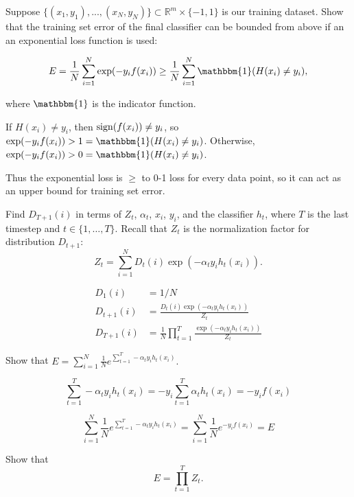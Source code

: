 Suppose $\{(x_1, y_1), ..., (x_N, y_N)\} \subset \mathbb{R}^m \times \{-1,1\}$ is our training dataset.  Show that the training set error of the final classifier can be bounded from
above if an an exponential loss function is used:

$$E = \frac{1}{N} \sum\limits_{i=1}^N \exp(-y_{i}f(x_i)) \geq \frac{1}{N} \sum\limits_{i=1}^N \mathbbm{1}(H(x_i) \neq y_i),$$

where $\mathbbm{1}$ is the indicator function.

\begin{solution}
    If $H(x_i) \neq y_i$, then $\operatorname{sign}(f(x_i)) \neq y_i$, so $\exp(-y_i f(x_i)) > 1 = \mathbbm{1}(H(x_i) \neq y_i)$.
    Otherwise, $\exp(-y_i f(x_i)) > 0 = \mathbbm{1}(H(x_i) \neq y_i)$.

    Thus the exponential loss is $\geq$ to 0-1 loss for every data point, so it can act as an upper bound for training set error.
\end{solution}

\problem[3]
Find $D_{T + 1}(i)$ in terms of $Z_t$, $\alpha_t$, $x_i$, $y_i$, and the classifier $h_t$, where $T$ is the last timestep and $t \in \{1, \ldots, T\}$. Recall that $Z_t$ is the normalization factor for distribution $D_{t+1}$:
$$Z_t = \sum\limits_{i=1}^N D_t(i) \exp(-\alpha_{t}y_{i}h_{t}(x_{i})).$$

\pagebreak

\begin{solution}
    \begin{align*}
        D_1(i) &= 1/N \\
        D_{t+1}(i) &= \frac{D_t(i) \exp(-\alpha_t y_i h_t(x_i))}{Z_t} \\
        D_{T+1}(i) &= \frac{1}{N} \prod_{t=1}^{T} \frac{\exp(-\alpha_t y_i h_t(x_i))}{Z_t}
    \end{align*}
\end{solution}

\problem[2]
Show that $E = \sum_{i=1}^N  \frac{1}{N} e^{\sum_{t=1}^T -\alpha_t y_i h_t(x_i)}.$

\begin{solution}
    $$
    \sum_{t=1}^T -\alpha_t y_i h_t(x_i) =
    -y_i \sum_{t=1}^T \alpha_t h_t(x_i) =
    -y_i f(x_i)
    $$

    $$
    \sum_{i=1}^N  \frac{1}{N} e^{\sum_{t=1}^T -\alpha_t y_i h_t(x_i)} = 
    \sum_{i=1}^N  \frac{1}{N} e^{-y_i f(x_i)} = 
    E
    $$
\end{solution}

\problem[5]
Show that
$$E = \prod\limits_{t=1}^T Z_t.$$

